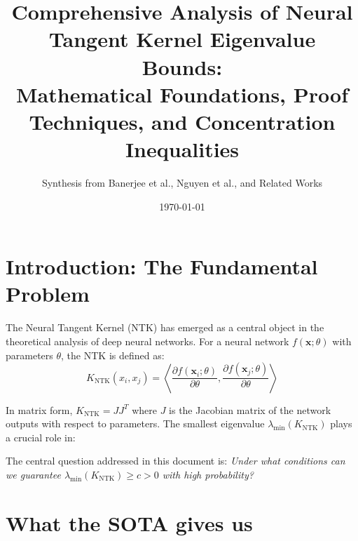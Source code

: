 \documentclass{article}
\title{Comprehensive Analysis of Neural Tangent Kernel Eigenvalue Bounds:\\
Mathematical Foundations, Proof Techniques, and Concentration Inequalities}
\author{Synthesis from Banerjee et al., Nguyen et al., and Related Works}
\date{\today}
\newcommand{\x}{\mathbf{x}}
\newcommand{\KNTK}{K_{\text{NTK}}}
\newcommand{\lambdaMin}{\lambda_{\min}}
\newcommand{\TildeOmega}{\tilde{\Omega}}
\begin{document}
\maketitle

\begin{abstract}
\end{abstract}

\tableofcontents
\newpage

\section{Introduction: The Fundamental Problem}

The Neural Tangent Kernel (NTK) has emerged as a central object in the theoretical analysis of deep neural networks. For a neural network $f(\x; \theta)$ with parameters $\theta$, the NTK is defined as:
$$\KNTK(x_i, x_j) = \left\langle \frac{\partial f(\x_i; \theta)}{\partial \theta}, \frac{\partial f(\x_j; \theta)}{\partial \theta} \right\rangle$$

In matrix form, $\KNTK = JJ^T$ where $J$ is the Jacobian matrix of the network outputs with respect to parameters. The smallest eigenvalue $\lambdaMin(\KNTK)$ plays a crucial role in:


The central question addressed in this document is: \textit{Under what conditions can we guarantee $\lambdaMin(\KNTK) \geq c > 0$ with high probability?}


\section{What the SOTA gives us}
\end{document}
